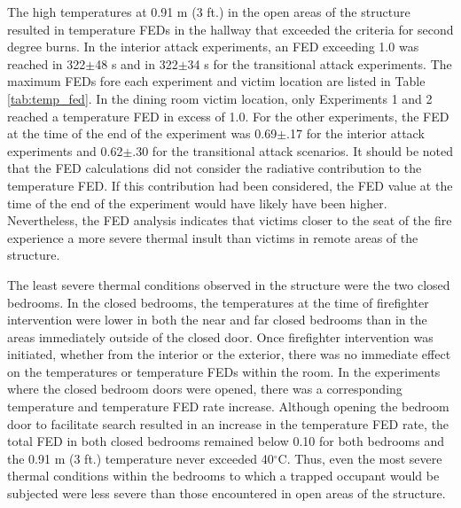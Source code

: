 \documentclass[12pt,oneside]{article}
\begin{document}
The high temperatures at 0.91 m (3 ft.) in the open areas of the structure resulted in temperature FEDs in the hallway that exceeded the criteria for second degree burns. In the interior attack experiments, an FED exceeding 1.0 was reached in 322$\pm$48 s and in 322$\pm$34 s for the transitional attack experiments.  The maximum FEDs fore each experiment and victim location are listed in Table \ref{tab:temp_fed}. In the dining room victim location, only Experiments 1 and 2 reached a temperature FED in excess of 1.0. For the other experiments, the FED at the time of the end of the experiment was 0.69$\pm$.17 for the interior attack experiments and 0.62$\pm$.30 for the transitional attack scenarios. It should be noted that the FED calculations did not consider the radiative contribution to the temperature FED. If this contribution had been considered, the FED value at the time of the end of the experiment would have likely have been higher. Nevertheless, the FED analysis indicates that victims closer to the seat of the fire experience a more severe thermal insult than victims in remote areas of the structure.

The least severe thermal conditions observed in the structure were the two closed bedrooms. In the closed bedrooms, the temperatures at the time of firefighter intervention were lower in both the near and far closed bedrooms than in the areas immediately outside of the closed door. Once firefighter intervention was initiated, whether from the interior or the exterior, there was no immediate effect on the temperatures or temperature FEDs within the room. In the experiments where the closed bedroom doors were opened, there was a corresponding temperature and temperature FED rate increase. Although opening the bedroom door to facilitate search resulted in an increase in the temperature FED rate, the total FED in both closed bedrooms remained below 0.10 for both bedrooms and the 0.91 m (3 ft.) temperature never exceeded 40$^{\circ}$C. Thus, even the most severe thermal conditions within the bedrooms to which a trapped occupant would be subjected were less severe than those encountered in open areas of the structure. 
\end{document}
